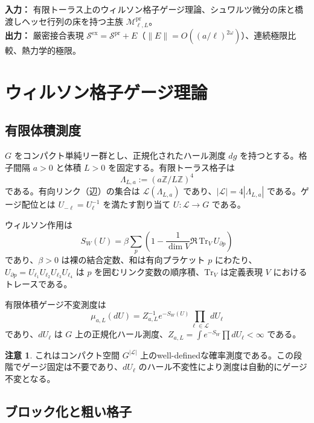 \documentclass[12pt]{article}
\theoremstyle{plain}
\theoremstyle{definition}
\newtheorem{remark}[theorem]{注意}
\numberwithin{equation}{section}
\newcommand{\Z}{\mathbb{Z}}
\newcommand{\pr}{\mathrm{pr}}
\newcommand{\ex}{\mathrm{ex}}
\begin{document}
\noindent\textbf{入力：} 有限トーラス上のウィルソン格子ゲージ理論、シュワルツ微分の床と橋渡しヘッセ行列の床を持つ主族 $\mathcal{M}^{\pr}_{\ell,L}$。\\
\textbf{出力：} 厳密接合表現 $\mathcal{S}^{\ex}=\mathcal{S}^{\pr}+E$（$\|E\|=O((a/\ell)^{2\omega})$）、連続極限比較、熱力学的極限。

\section{ウィルソン格子ゲージ理論}\label{sec:wilson}

\subsection{有限体積測度}

$G$ をコンパクト単純リー群とし、正規化されたハール測度 $dg$ を持つとする。格子間隔 $a>0$ と体積 $L>0$ を固定する。有限トーラス格子は
\begin{equation}
\Lambda_{L,a} := (a\Z/L\Z)^4
\end{equation}
である。有向リンク（辺）の集合は $\mathcal{L}(\Lambda_{L,a})$ であり、$|\mathcal{L}|=4|\Lambda_{L,a}|$ である。ゲージ配位とは $U_{-\ell}=U_\ell^{-1}$ を満たす割り当て $U:\mathcal{L}\to G$ である。

ウィルソン作用は
\begin{equation}
S_W(U) = \beta\sum_p\left(1-\frac{1}{\dim V}\Re\,\mathrm{Tr}_V\, U_{\partial p}\right)
\end{equation}
であり、$\beta>0$ は裸の結合定数、和は有向プラケット $p$ にわたり、$U_{\partial p}=U_{\ell_1}U_{\ell_2}U_{\ell_3}U_{\ell_4}$ は $p$ を囲むリンク変数の順序積、$\mathrm{Tr}_V$ は定義表現 $V$ におけるトレースである。

有限体積ゲージ不変測度は
\begin{equation}
\mu_{a,L}(dU) = Z_{a,L}^{-1}e^{-S_W(U)}\prod_{\ell\in\mathcal{L}} dU_\ell
\end{equation}
であり、$dU_\ell$ は $G$ 上の正規化ハール測度、$Z_{a,L}=\int e^{-S_W}\prod dU_\ell<\infty$ である。

\begin{remark}
これはコンパクト空間 $G^{|\mathcal{L}|}$ 上のwell-definedな確率測度である。この段階でゲージ固定は不要であり、$dU_\ell$ のハール不変性により測度は自動的にゲージ不変となる。
\end{remark}

\subsection{ブロック化と粗い格子}
\end{document}
